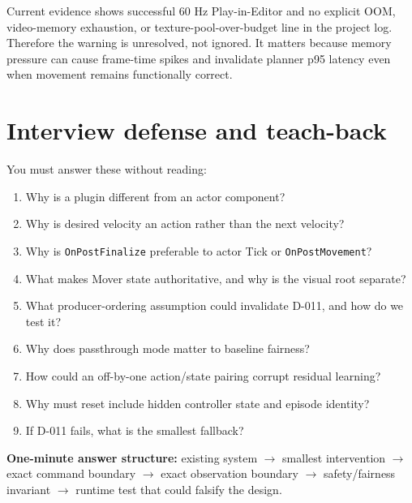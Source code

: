 \documentclass[11pt]{article}
\begin{document}
Current evidence shows successful 60 Hz Play-in-Editor and no explicit OOM, video-memory exhaustion,
or texture-pool-over-budget line in the project log. Therefore the warning is unresolved, not
ignored. It matters because memory pressure can cause frame-time spikes and invalidate planner p95
latency even when movement remains functionally correct.

\section{Interview defense and teach-back}\label{sec:exam}

You must answer these without reading:

\begin{enumerate}
  \item Why is a plugin different from an actor component?
  \item Why is desired velocity an action rather than the next velocity?
  \item Why is \texttt{OnPostFinalize} preferable to actor Tick or \texttt{OnPostMovement}?
  \item What makes Mover state authoritative, and why is the visual root separate?
  \item What producer-ordering assumption could invalidate D-011, and how do we test it?
  \item Why does passthrough mode matter to baseline fairness?
  \item How could an off-by-one action/state pairing corrupt residual learning?
  \item Why must reset include hidden controller state and episode identity?
  \item If D-011 fails, what is the smallest fallback?
\end{enumerate}

\textbf{One-minute answer structure:} existing system $\rightarrow$ smallest intervention
$\rightarrow$ exact command boundary $\rightarrow$ exact observation boundary $\rightarrow$
safety/fairness invariant $\rightarrow$ runtime test that could falsify the design.
\end{document}
